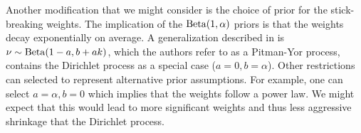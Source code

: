 Another modification that we might consider is the choice of prior for the stick-breaking weights. The implication of the $\operatorname{Beta}(1, \alpha)$ priors is that the weights decay exponentially on average. A generalization described in \cite{ishwaran2001} is $\nu \sim \operatorname{Beta}(1-a, b + ak)$, which the authors refer to as a Pitman-Yor process, contains the Dirichlet process as a special case ($a=0,b=\alpha$). Other restrictions can selected to represent alternative prior assumptions. For example, one can select $a=\alpha, b=0$ which implies that the weights follow a power law. We might expect that this would lead to more significant weights and thus less aggressive shrinkage that the Dirichlet process.


